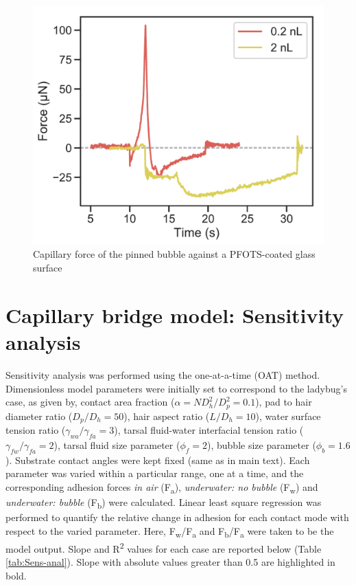 \documentclass[english]{achemso}
\begin{document}
\begin{figure}[H]
\begin{centering}
\includegraphics{FigureS4-Expt_bubble_force}\caption{Capillary force of the pinned bubble against a PFOTS-coated glass surface \label{fig:Bubble_capillary_force}}
\par\end{centering}
\end{figure}

\section{Capillary bridge model: Sensitivity analysis}

Sensitivity analysis was performed using the one-at-a-time (OAT) method. Dimensionless model parameters were initially set to correspond to the ladybug's case, as given by,
contact area fraction ($\alpha=ND_{h}^{2}/D_{p}^{2}=0.1$), pad to hair diameter ratio ($D_p/D_h=50$), hair aspect ratio ($L/D_{h}=10$), water surface tension ratio ($\gamma_{wa}/\gamma_{fa}=3$),
tarsal fluid-water interfacial tension ratio ($\gamma_{fw}/\gamma_{fa}=2$), tarsal fluid size parameter ($\phi_{f}=2$), bubble size parameter ($\phi_{b}=1.6$). Substrate contact angles were kept fixed (same as in main text). Each parameter was varied within a particular range, one at a time, and the corresponding adhesion forces \emph{in air} (F\textsubscript{a}),   \emph{underwater: no bubble} (F\textsubscript{w}) and \emph{underwater: bubble} (F\textsubscript{b}) were calculated. Linear least square regression was performed to quantify the relative change in adhesion for each contact mode with respect to the varied parameter. Here, F\textsubscript{w}/F\textsubscript{a} and F\textsubscript{b}/F\textsubscript{a} were taken to be the model output. Slope and R\textsuperscript{2} values for each case are reported below (Table \ref{tab:Sens-anal}). Slope with absolute values greater than 0.5 are highlighted in bold.
\end{document}
